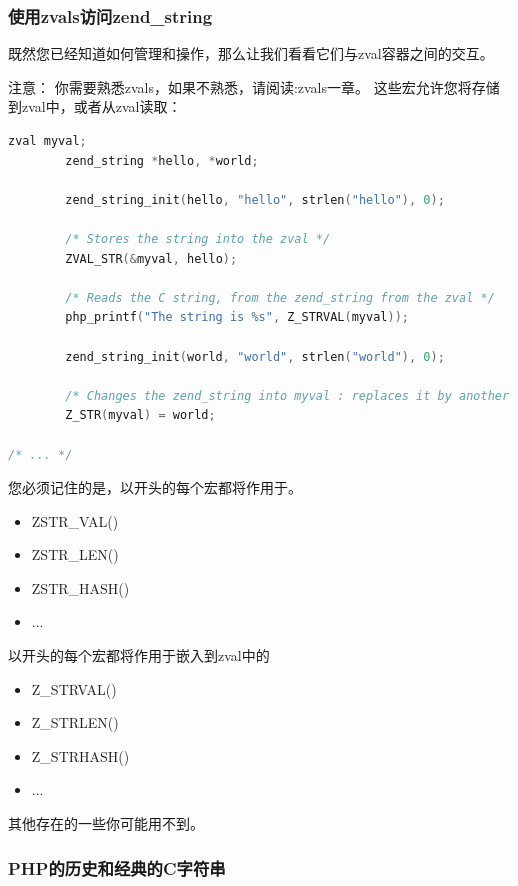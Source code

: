 \subsubsection{使用zvals访问zend\_string}

既然您已经知道如何管理和操作，那么让我们看看它们与zval容器之间的交互。

注意：
你需要熟悉zvals，如果不熟悉，请阅读:zvals一章。
这些宏允许您将存储到zval中，或者从zval读取：

\begin{lstlisting}[language=c]
        zval myval;
        zend_string *hello, *world;

        zend_string_init(hello, "hello", strlen("hello"), 0);

        /* Stores the string into the zval */
        ZVAL_STR(&myval, hello);

        /* Reads the C string, from the zend_string from the zval */
        php_printf("The string is %s", Z_STRVAL(myval));

        zend_string_init(world, "world", strlen("world"), 0);

        /* Changes the zend_string into myval : replaces it by another one */
        Z_STR(myval) = world;

/* ... */
\end{lstlisting} 

您必须记住的是，以开头的每个宏都将作用于。

\begin{itemize}
    \item ZSTR\_VAL()
    \item ZSTR\_LEN()
    \item ZSTR\_HASH()
    \item ...
\end{itemize}

以开头的每个宏都将作用于嵌入到zval中的

\begin{itemize}
        \item Z\_STRVAL()
        \item Z\_STRLEN()
        \item Z\_STRHASH()
        \item ...
\end{itemize}

其他存在的一些你可能用不到。

\subsubsection{PHP的历史和经典的C字符串}

